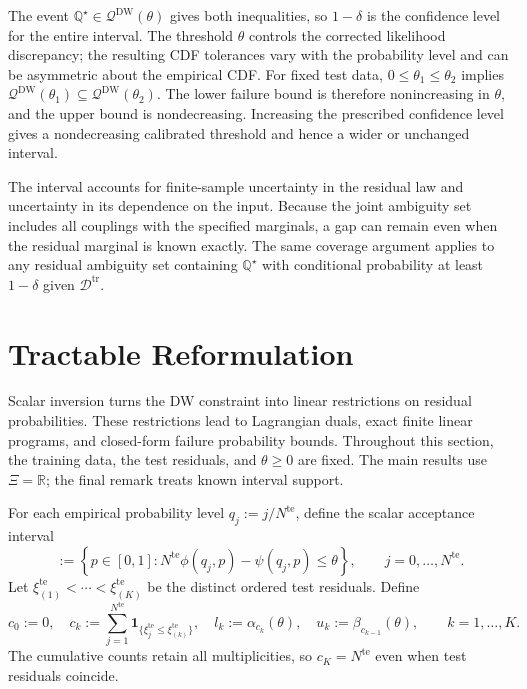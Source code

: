 \documentclass[review,11pt,3p,authoryear,nopreprintline]{elsarticle}
\begin{document}
The event $\mathbb Q^\star\in\mathcal Q^{\mathrm{DW}}(\theta)$ gives both inequalities, so $1-\delta$ is the confidence level for the entire interval. The threshold $\theta$ controls the corrected likelihood discrepancy; the resulting CDF tolerances vary with the probability level and can be asymmetric about the empirical CDF. For fixed test data, $0\le\theta_1\le\theta_2$ implies $\mathcal Q^{\mathrm{DW}}(\theta_1)\subseteq\mathcal Q^{\mathrm{DW}}(\theta_2)$. The lower failure bound is therefore nonincreasing in $\theta$, and the upper bound is nondecreasing. Increasing the prescribed confidence level gives a nondecreasing calibrated threshold and hence a wider or unchanged interval.

The interval accounts for finite-sample uncertainty in the residual law and uncertainty in its dependence on the input. Because the joint ambiguity set includes all couplings with the specified marginals, a gap can remain even when the residual marginal is known exactly. The same coverage argument applies to any residual ambiguity set containing $\mathbb Q^\star$ with conditional probability at least $1-\delta$ given $\mathcal D^{\mathrm{tr}}$.


\section{Tractable Reformulation}
\label{sec-reformulation}

Scalar inversion turns the DW constraint into linear restrictions on residual probabilities. These restrictions lead to Lagrangian duals, exact finite linear programs, and closed-form failure probability bounds. Throughout this section, the training data, the test residuals, and $\theta\ge0$ are fixed. The main results use $\Xi=\mathbb R$; the final remark treats known interval support.

For each empirical probability level $q_j:=j/N^{\mathrm{te}}$, define the scalar acceptance interval
\begin{equation*}
  [\alpha_j(\theta),\beta_j(\theta)]
  :=\left\{p\in[0,1]:
  N^{\mathrm{te}}\phi(q_j,p)-\psi(q_j,p)\le\theta\right\},
  \qquad j=0,\ldots,N^{\mathrm{te}}.
\end{equation*}
Let $\xi_{(1)}^{\mathrm{te}}<\cdots<\xi_{(K)}^{\mathrm{te}}$ be the distinct ordered test residuals. Define
\begin{equation*} 
    c_0 :=0, \quad
    c_k :=\sum_{j=1}^{N^{\mathrm{te}}}\mathbf1_{\{\xi_j^{\mathrm{te}}\le\xi_{(k)}^{\mathrm{te}}\}}, \quad
    l_k :=\alpha_{c_k}(\theta),  \quad
    u_k :=\beta_{c_{k-1}}(\theta),\qquad k=1,\ldots,K. 
\end{equation*}
The cumulative counts retain all multiplicities, so $c_K=N^{\mathrm{te}}$ even when test residuals coincide.
\end{document}
